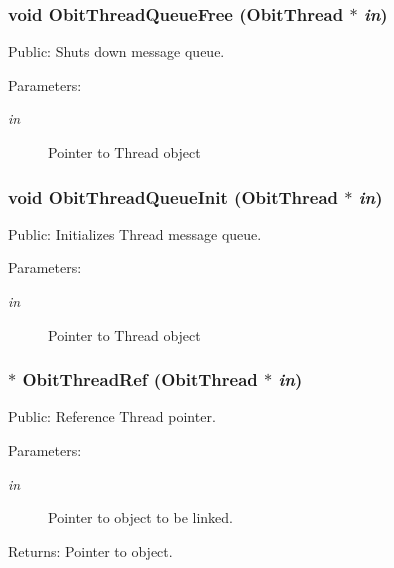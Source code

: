 \subsubsection{\setlength{\rightskip}{0pt plus 5cm}void Obit\-Thread\-Queue\-Free ({\bf Obit\-Thread} $\ast$ {\em in})}\label{ObitThread_8c_a30}


Public: Shuts down message queue. 

\begin{Desc}
\item[Parameters:]
\begin{description}
\item[{\em in}]Pointer to Thread object \end{description}
\end{Desc}
\subsubsection{\setlength{\rightskip}{0pt plus 5cm}void Obit\-Thread\-Queue\-Init ({\bf Obit\-Thread} $\ast$ {\em in})}\label{ObitThread_8c_a28}


Public: Initializes Thread message queue. 

\begin{Desc}
\item[Parameters:]
\begin{description}
\item[{\em in}]Pointer to Thread object \end{description}
\end{Desc}
\subsubsection{$\ast$ Obit\-Thread\-Ref ({\bf Obit\-Thread} $\ast$ {\em in})}\label{ObitThread_8c_a5}


Public: Reference Thread pointer. 

\begin{Desc}
\item[Parameters:]
\begin{description}
\item[{\em in}]Pointer to object to be linked. \end{description}
\end{Desc}
\begin{Desc}
\item[Returns:]Pointer to object. \end{Desc}
